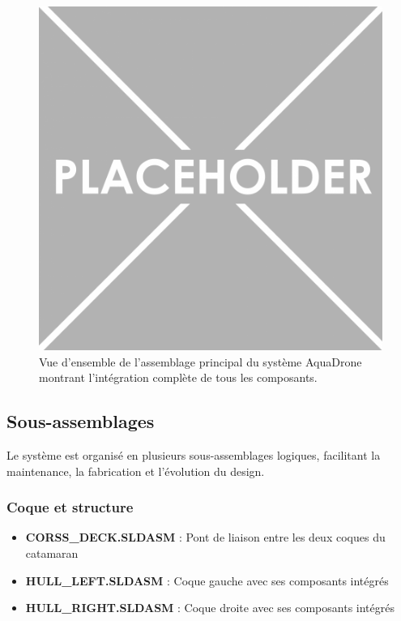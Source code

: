 {\begin{figure}[!htpb]
    \centering
    \includegraphics[width=0.8\linewidth]{Figures/PezizaTuberosa.jpg}
    \caption[Vue d'ensemble de l'assemblage principal]{Vue d'ensemble de l'assemblage principal du système AquaDrone montrant l'intégration complète de tous les composants.}
    \label{fig:assemblage-principal}
\end{figure}

\subsection{Sous-assemblages}
Le système est organisé en plusieurs sous-assemblages logiques, facilitant la maintenance, la fabrication et l'évolution du design.

\subsubsection{Coque et structure}
\begin{itemize}
    \setlength{\itemsep}{.375em}
    \item \textbf{CORSS\_DECK.SLDASM} : Pont de liaison entre les deux coques du catamaran
    \item \textbf{HULL\_LEFT.SLDASM} : Coque gauche avec ses composants intégrés
    \item \textbf{HULL\_RIGHT.SLDASM} : Coque droite avec ses composants intégrés
\end{itemize}

}
